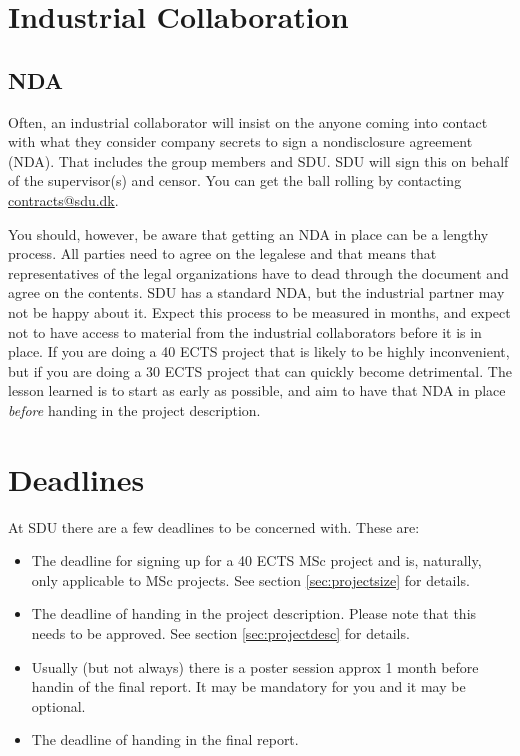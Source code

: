 \documentclass[a4paper]{memoir}
\begin{document}
\section{Industrial Collaboration}




\subsection{NDA}

Often, an industrial collaborator will insist on the anyone coming into contact with what they consider company secrets to sign a nondisclosure agreement (NDA). That includes the group members and SDU. SDU will sign this on behalf of the supervisor(s) and censor. You can get the ball rolling by contacting \href{mailto:contracts@sdu.dk}{contracts@sdu.dk}.

You should, however, be aware that getting an NDA in place can be a lengthy process. All parties need to agree on the legalese and that means that representatives of the legal organizations have to dead through the document and agree on the contents. SDU has a standard NDA, but the industrial partner may not be happy about it. Expect this process to be measured in months, and expect not to have access to material from the industrial collaborators before it is in place. If you are doing a 40 ECTS project that is likely to be highly inconvenient, but if you are doing a 30 ECTS project that can quickly become detrimental. The lesson learned is to start as early as possible, and aim to have that NDA in place \textsl{before} handing in the project description.

\section{Deadlines}

At SDU there are a few deadlines to be concerned with. These are:
\begin{itemize}
  \item The deadline for signing up for a 40 ECTS MSc project and is, naturally, only applicable to MSc projects. See section \ref{sec:projectsize} for details.
  \item The deadline of handing in the project description. Please note that this needs to be approved. See section \ref{sec:projectdesc} for details.
  \item Usually (but not always) there is a poster session approx 1 month before handin of the final report. It may be mandatory for you and it may be optional.
  \item The deadline of handing in the final report.
\end{itemize}
\end{document}
